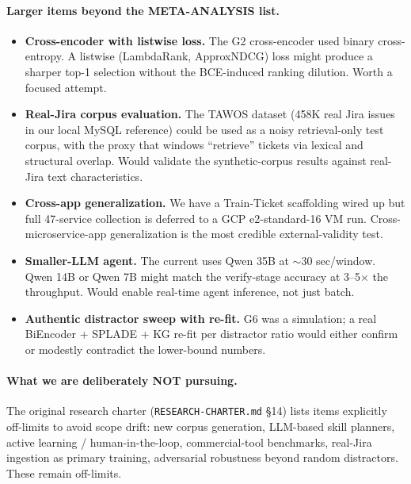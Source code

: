 \paragraph{Larger items beyond the META-ANALYSIS list.}

\begin{itemize}
\item \textbf{Cross-encoder with listwise loss.} The G2 cross-encoder used binary cross-entropy. A listwise (LambdaRank, ApproxNDCG) loss might produce a sharper top-1 selection without the BCE-induced ranking dilution. Worth a focused attempt.
\item \textbf{Real-Jira corpus evaluation.} The TAWOS dataset (458K real Jira issues in our local MySQL reference) could be used as a noisy retrieval-only test corpus, with the proxy that windows ``retrieve'' tickets via lexical and structural overlap. Would validate the synthetic-corpus results against real-Jira text characteristics.
\item \textbf{Cross-app generalization.} We have a Train-Ticket scaffolding wired up but full 47-service collection is deferred to a GCP e2-standard-16 VM run. Cross-microservice-app generalization is the most credible external-validity test.
\item \textbf{Smaller-LLM agent.} The current \agent{} uses Qwen 35B at $\sim$30 sec/window. Qwen 14B or Qwen 7B might match the verify-stage accuracy at 3--5$\times$ the throughput. Would enable real-time agent inference, not just batch.
\item \textbf{Authentic distractor sweep with re-fit.} G6 was a simulation; a real BiEncoder + SPLADE + KG re-fit per distractor ratio would either confirm or modestly contradict the lower-bound numbers.
\end{itemize}

\paragraph{What we are deliberately NOT pursuing.} The original research charter (\texttt{RESEARCH-CHARTER.md} §14) lists items explicitly off-limits to avoid scope drift: new corpus generation, LLM-based skill planners, active learning / human-in-the-loop, commercial-tool benchmarks, real-Jira ingestion as primary training, adversarial robustness beyond random distractors. These remain off-limits.
